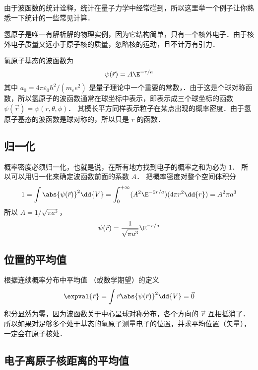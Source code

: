 

由于波函数的统计诠释，统计在量子力学中经常碰到，所以这里举一个例子让你熟悉一下统计的一些常见计算．

氢原子是唯一有解析解的物理实例，因为它结构简单，只有一个核外电子．由于核外电子质量又远小于原子核的质量，忽略核的运动，且不计万有引力．

氢原子基态的波函数为
\begin{equation}
\psi(\vec r) = A\E^{-r/a}
\end{equation}
其中 $a_0 = 4\pi\varepsilon_0 \hbar ^2/(m_e e^2)$ 是量子理论中一个重要的常数，．由于这是个球对称函数，所以氢原子的波函数通常在球坐标中表示，即表示成三个球坐标的函数 $\psi (\vec r) = \psi (r, \theta, \phi)$． 其模长平方同样表示粒子在某点出现的概率密度．由于氢原子基态的波函数是球对称的，所以只是 $r$ 的函数．

\subsection{归一化}
  
概率密度必须归一化，也就是说，在所有地方找到电子的概率之和为必为 $1$． 所以可以用归一化来确定波函数前面的系数 $A$． 把概率密度对整个空间体积分
\begin{equation}
1 = \int \abs{\psi(\vec r)} ^2 \dd{V}  = \int_0^{+\infty} (A^2 \E^{-2r/a})(4\pi r^2\dd{r})  = A^2 \pi a^3
\end{equation}
所以 $A = 1/\sqrt{\pi a^3}$， 
\begin{equation}
\psi (\vec r) = \frac{1}{\sqrt{\pi a^3}} \E^{-r/a}
\end{equation}

\subsection{位置的平均值}

 根据连续概率分布中平均值%
（或数学期望）的定义
\begin{equation}
\expval{\vec r} = \int \vec r \abs{\psi (\vec r)} ^2 \dd{V} =  \vec 0
\end{equation}
积分显然为零，因为波函数关于中心呈球对称分布，各个方向的 $\vec r$ 互相抵消了．所以如果对足够多个处于基态的氢原子测量电子的位置，并求平均位置（矢量）， 一定会在原子核处．

\subsection{电子离原子核距离的平均值}

